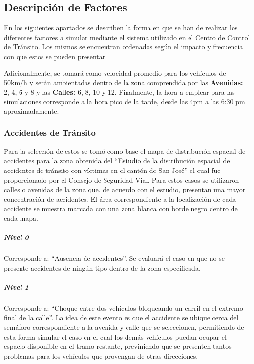 \subsection{Descripci\'{o}n de Factores}

En los siguientes apartados se describen la forma en que se han de realizar los diferentes factores a simular mediante el sistema utilizado en el Centro de Control de Tr\'{a}nsito.  Los mismos se encuentran ordenados seg\'{u}n el impacto y frecuencia con que estos se pueden presentar.

Adicionalmente, se tomar\'{a} como velocidad promedio para los veh\'{i}culos de 50km/h y ser\'{a}n ambientadas dentro de la zona comprendida por las \textbf{Avenidas:} 2, 4, 6 y 8 y las \textbf{Calles:} 6, 8, 10 y 12. Finalmente, la hora a emplear para las simulaciones corresponde a la hora pico de la tarde, desde las 4pm a las 6:30 pm aproximadamente.

\subsubsection{Accidentes de Tr\'{a}nsito}
Para la selecci\'{o}n de estos se tom\'{o} como base el mapa de distribuci\'{o}n espacial de accidentes para la zona obtenida del “Estudio de la distribuci\'{o}n espacial de accidentes de tr\'{a}nsito con v\'{i}ctimas en el cant\'{o}n de San Jos\'{e}” el cual fue proporcionado por el Consejo de Seguridad Vial. Para estos casos se utilizaron calles o avenidas de la zona que, de acuerdo con el estudio, presentan una mayor  concentraci\'{o}n de accidentes. El \'{a}rea correspondiente a la localizaci\'{o}n de cada accidente se muestra marcada con una zona blanca con borde negro dentro de cada mapa.

\subparagraph{Nivel 0}

Corresponde a: “Ausencia de accidentes”. Se evaluar\'{a} el caso en que no se presente accidentes de ning\'{u}n tipo dentro de la zona especificada.

\subparagraph{Nivel 1}

Corresponde a: “Choque entre dos veh\'{i}culos bloqueando un carril en el extremo final de la calle”.  La idea de este evento es que el accidente se ubique cerca del sem\'{a}foro correspondiente a la avenida y calle que se seleccionen, permitiendo de esta forma simular el caso en el cual los dem\'{a}s veh\'{i}culos puedan ocupar el espacio disponible en el tramo restante, previniendo que se presenten tantos problemas para los veh\'{i}culos que provengan de otras direcciones.


